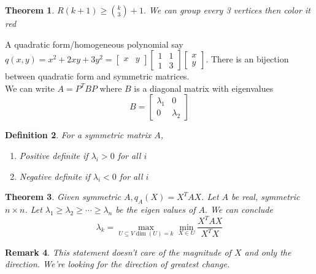 \documentclass[a4paper]{article}
\newtheorem{thm}{Theorem}[section]
\newtheorem{defn}[thm]{Definition}
\newtheorem{rmk}[thm]{Remark}
\begin{document}
\begin{thm}
    $R(k+1)\geq {k \choose 3}+1.$ We can group every 3 vertices then color it red 
\end{thm}
\noindent A quadratic form/homogeneous polynomial say $q(x,y)=x^2+2xy+3y^2=\begin{bmatrix}x & y \end{bmatrix} \begin{bmatrix} 1 & 1 \\ 1 & 3 \end{bmatrix} \begin{bmatrix}
        x \\ y\end{bmatrix}$. There is an bijection between quadratic form and symmetric matrices. \\
We can write $A=P^TBP$ where $B$ is a diagonal matrix with eigenvalues $$B=\begin{bmatrix}
    \lambda_1 & 0 \\ 0 & \lambda_2
\end{bmatrix}$$
\begin{defn}
    For a symmetric matrix $A$,
    \begin{enumerate}
        \item Positive definite if $\lambda_i >0$ for all $i$
        \item Negative definite if $\lambda_i<0$ for all $i$
    \end{enumerate}
\end{defn}
\begin{thm}
    Given symmetric $A, q_A(X)=X^TAX$. Let $A$ be real, symmetric $n\times n $. Let $\lambda_1\geq \lambda_2\geq \cdots \geq \lambda_n$ be the eigen values of $A.$ We can conclude $$\lambda_k=\max_{U\subseteq V \dim(U)=k}\min_{X\in U}\frac{X^TAX}{X^TX}$$
\end{thm}
\begin{rmk}
    This statement doesn't care of the magnitude of $X$ and only the direction. We're looking for the direction of greatest change. 
\end{rmk}
\end{document}

